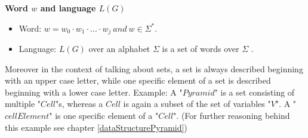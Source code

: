 \begin{DefGrey}\label{wordLanguage} \textbf{Word $w$ and language $L(G)$}
	\begin{itemize}
		\item Word: $w = w_0\cdot w_1\cdot ...\cdot w_j~and~w \in \Sigma^*$.
		\item Language: $L(G)$ over an alphabet $\Sigma$ is a set of words over $\Sigma$ .
	\end{itemize}
\end{DefGrey}
\noindent Moreover in the context of talking about sets, a set is always described beginning with an upper case letter, while one specific element of a set is described beginning with a lower case letter. Example: A "$Pyramid$" is a set consisting of multiple "$Cell$"s, whereas a $Cell$ is again a subset of the set of variables "$V$". A "$cellElement$" is one specific element of a "$Cell$". (For further reasoning behind this example see chapter \ref{dataStructurePyramid}) 

